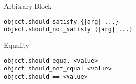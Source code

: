 \documentclass{beamer}
\begin{document}
\begin{frame}[fragile]
 Arbitrary Block
  \begin{lstlisting}
object.should_satisfy {|arg| ...}
object.should_not_satisfy {|arg| ...}
  \end{lstlisting}

Equality
  \begin{lstlisting}
object.should_equal <value>
object.should_not_equal <value>
object.should == <value>
  \end{lstlisting}
\end{frame}
\end{document}
